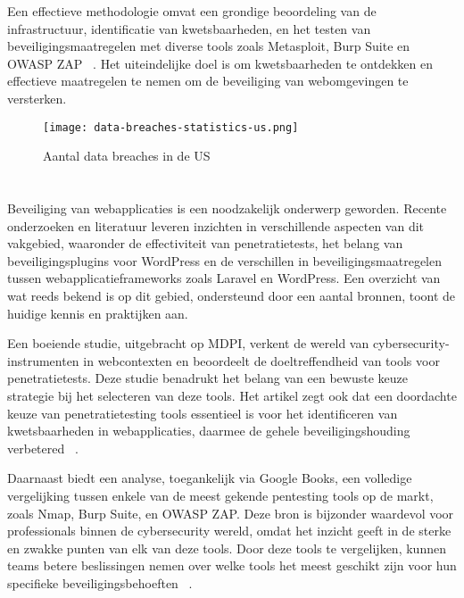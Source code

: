 Een effectieve methodologie omvat een grondige beoordeling van de infrastructuur, identificatie van kwetsbaarheden, en het 
testen van beveiligingsmaatregelen met diverse tools zoals Metasploit, Burp Suite en OWASP ZAP ~\autocite{Ravindran2022}. 
Het uiteindelijke doel is om kwetsbaarheden te ontdekken en effectieve maatregelen te nemen om de beveiliging van webomgevingen 
te versterken.

\begin{figure}
    \centering
    \texttt{[image: data-breaches-statistics-us.png]}
    \caption[Aantal data breaches in de US ]{Aantal data breaches in de US }
\end{figure}


\section{}
\label{sec:wat-weten-we-uit-de-literatuur}
Beveiliging van webapplicaties is een noodzakelijk onderwerp geworden. Recente onderzoeken en literatuur leveren 
inzichten in verschillende aspecten van dit vakgebied, waaronder de effectiviteit van penetratietests, het belang van beveiligingsplugins voor WordPress en de verschillen 
in beveiligingsmaatregelen tussen webapplicatieframeworks zoals Laravel en WordPress. Een overzicht van wat reeds bekend is op dit gebied, ondersteund door een aantal 
bronnen, toont de huidige kennis en praktijken aan.

Een boeiende studie, uitgebracht op MDPI, verkent de wereld van cybersecurity-instrumenten in webcontexten en beoordeelt de doeltreffendheid van tools voor penetratietests.
Deze studie benadrukt het belang van een bewuste keuze strategie bij het selecteren van deze tools. Het artikel zegt ook dat 
een doordachte keuze van penetratietesting tools essentieel is voor het identificeren van kwetsbaarheden in webapplicaties, daarmee de gehele beveiligingshouding 
verbetered ~\autocite{Albahar2022}.

Daarnaast biedt een analyse, toegankelijk via Google Books, een volledige vergelijking tussen enkele van de meest gekende pentesting tools op de markt, 
zoals Nmap, Burp Suite, en OWASP ZAP. Deze bron is bijzonder waardevol voor professionals binnen de cybersecurity wereld, omdat het inzicht geeft in de sterke en zwakke 
punten van elk van deze tools. Door deze tools te vergelijken, kunnen teams betere beslissingen nemen over welke tools het meest geschikt zijn 
voor hun specifieke beveiligingsbehoeften ~\autocite{Velu2022}.


